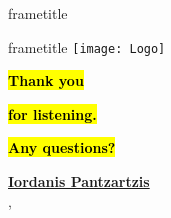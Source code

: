 \documentclass[aspectratio=169,11pt,xcolor=dvipsnames, t, onlytextwidth]{beamer}
\begin{document}
\begin{frame}{}
\setul{0.85ex}{0.28ex}

\begin{beamercolorbox}[sep=0cm, ht=0.75cm, leftskip=0.5cm, wd=\paperwidth]{frametitle}
 {\ul{\mbox{\textbf{}}}}
\end{beamercolorbox}

\vspace*{0.5cm}

\printbibliography

\end{frame}



\begin{frame}[t, plain]{}
\setul{0.6ex}{0.15ex}

\begin{beamercolorbox}[right, sep=-5cm, ht=2.5cm, wd=\paperwidth]{frametitle}
        \texttt{[image: Logo]}
    \end{beamercolorbox}


\huge{\hl{\textbf{ Thank you }}}



\huge{\hl{\textbf{ for listening. }}}

\huge{\hl{\textbf{ Any questions? }}}

\vspace*{0.5cm}

\footnotesize{{\ul{\textbf{Iordanis Pantzartzis}}}}\\
\footnotesize{\insertinstitute, \insertdate}


\end{frame}
\end{document}
